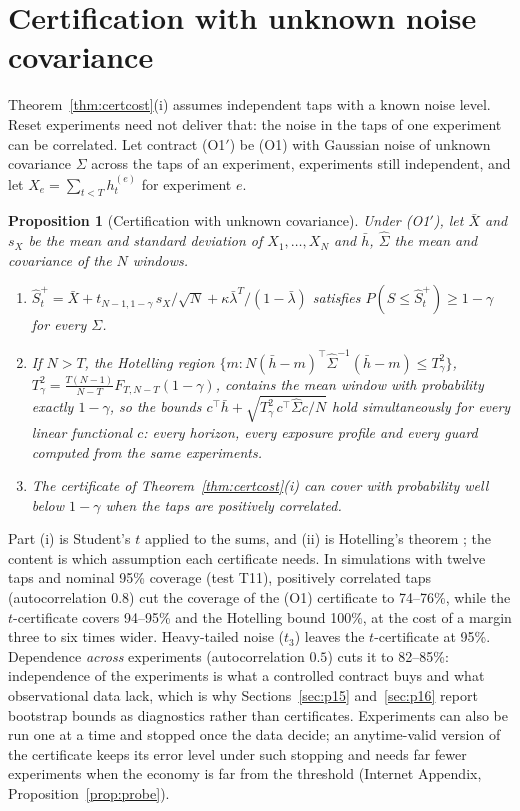 \documentclass[12pt]{article}
\newtheorem{proposition}[theorem]{Proposition}
\theoremstyle{definition}
\theoremstyle{remark}
\begin{document}
\section{Certification with unknown noise covariance} Theorem~\ref{thm:certcost}(i) assumes independent taps with a known noise level. Reset experiments need not deliver that: the noise in the taps of one experiment can be correlated. Let contract (O1$'$) be (O1) with Gaussian noise of unknown covariance $\Sigma$ across the taps of an experiment, experiments still independent, and let $X_e=\sum_{t<T}h^{(e)}_t$ for experiment $e$.

\begin{proposition}[Certification with unknown covariance]\label{prop:hotelling}
Under (O1$'$), let $\bar X$ and $s_X$ be the mean and standard deviation of $X_1,\ldots,X_N$ and $\bar h$, $\hat\Sigma$ the mean and covariance of the $N$ windows.
\begin{enumerate}[label=(\roman*)]
\item $\hat S^+_t=\bar X+t_{N-1,1-\gamma}\,s_X/\sqrt N+\kappa\bar\lambda^T/(1-\bar\lambda)$ satisfies $P(S\le\hat S^+_t)\ge1-\gamma$ for every $\Sigma$.
\item If $N>T$, the Hotelling region $\{m:N(\bar h-m)^\top\hat\Sigma^{-1}(\bar h-m)\le T^2_\gamma\}$, $T^2_\gamma=\frac{T(N-1)}{N-T}F_{T,N-T}(1-\gamma)$, contains the mean window with probability exactly $1-\gamma$, so the bounds $c^\top\bar h+\sqrt{T^2_\gamma\,c^\top\hat\Sigma c/N}$ hold simultaneously for every linear functional $c$: every horizon, every exposure profile and every guard computed from the same experiments.
\item The certificate of Theorem~\ref{thm:certcost}(i) can cover with probability well below $1-\gamma$ when the taps are positively correlated.
\end{enumerate}
\end{proposition}

Part (i) is Student's $t$ applied to the sums, and (ii) is Hotelling's theorem \citep{hotelling1931}; the content is which assumption each certificate needs. In simulations with twelve taps and nominal 95\% coverage (test T11), positively correlated taps (autocorrelation $0.8$) cut the coverage of the (O1) certificate to 74--76\%, while the $t$-certificate covers 94--95\% and the Hotelling bound 100\%, at the cost of a margin three to six times wider. Heavy-tailed noise ($t_3$) leaves the $t$-certificate at 95\%. Dependence \emph{across} experiments (autocorrelation $0.5$) cuts it to 82--85\%: independence of the experiments is what a controlled contract buys and what observational data lack, which is why Sections~\ref{sec:p15} and~\ref{sec:p16} report bootstrap bounds as diagnostics rather than certificates. Experiments can also be run one at a time and stopped once the data decide; an anytime-valid version of the certificate keeps its error level under such stopping and needs far fewer experiments when the economy is far from the threshold (Internet Appendix, Proposition~\ref{prop:probe}).
\end{document}

